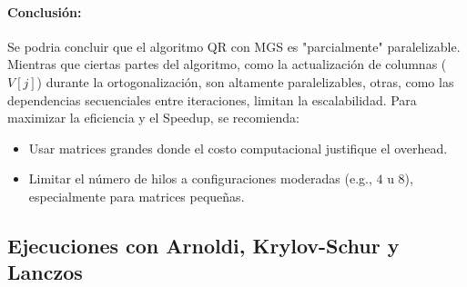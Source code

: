\documentclass{article}
\begin{document}
\paragraph{Conclusión:}
Se podria concluir que el algoritmo QR con MGS es "parcialmente" paralelizable. Mientras que ciertas partes del algoritmo, como la actualización de columnas (\(V[j]\)) durante la ortogonalización, son altamente paralelizables, otras, como las dependencias secuenciales entre iteraciones, limitan la escalabilidad. Para maximizar la eficiencia y el Speedup, se recomienda:
\begin{itemize}
    \item Usar matrices grandes donde el costo computacional justifique el overhead.
    \item Limitar el número de hilos a configuraciones moderadas (e.g., \(4\) u \(8\)), especialmente para matrices pequeñas.
\end{itemize}




\subsection{Ejecuciones con Arnoldi, Krylov-Schur y Lanczos}
\end{document}
